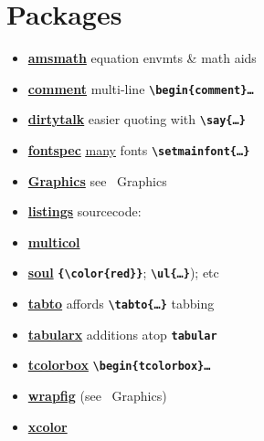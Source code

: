 \section{Packages}


\begin{itemize}[label=-,leftmargin=*]
    \item \textbf{\href{http://mirrors.ctan.org/macros/latex/required/amsmath/amsldoc.pdf}{amsmath}} \tabto*{15mm} equation envmts \& math aids
    \item \textbf{\href{http://mirrors.ctan.org/macros/latex/contrib/comment/comment.pdf}{comment}} \tabto*{15mm} multi-line {\tt\bf \textbackslash begin\{comment\}\dots}
    \item \textbf{\href{http://mirrors.ctan.org/macros/latex/contrib/dirtytalk/dirtytalk.pdf}{dirtytalk}} \tabto*{15mm} easier quoting with {\tt\bf \textbackslash say\{\dots\}}
    \item \textbf{\href{http://mirrors.ctan.org/macros/unicodetex/latex/fontspec/fontspec.pdf}{fontspec}} \tabto*{15mm} \href{https://tug.org/FontCatalogue/}{\ul{many}} fonts {\tt\bf\textbackslash setmainfont\{\dots\}}
    \item \textbf{\href{http://mirrors.ctan.org/macros/latex/required/graphics/graphics.pdf}{Graphics}} \tabto*{15mm} see \textsection\ Graphics
    \item \textbf{\href{http://mirrors.ctan.org/macros/latex/contrib/listings/listings.pdf}{listings}} \tabto*{15mm} sourcecode: 
    \item \textbf{\href{http://mirrors.ctan.org/macros/latex/required/tools/multicol.pdf}{multicol}} \tabto*{15mm} 
    \item \textbf{\href{http://mirrors.ctan.org/macros/generic/soul/soul.pdf}{soul}} \tabto*{15mm} {\tt\bf \{\textbackslash color\{red\}\}}; {\tt\bf \textbackslash ul\{\dots\}}); etc
    \item \textbf{\href{http://mirrors.ctan.org/macros/latex/contrib/tabto/tabto-doc.pdf}{tabto}} \tabto*{15mm} affords {\tt\bf \textbackslash tabto\{\dots\}} tabbing
    \item \textbf{\href{http://mirrors.ctan.org/macros/latex/required/tools/tabularx.pdf}{tabularx}} \tabto*{15mm} additions atop {\tt\bf tabular}
    \item \textbf{\href{https://www.overleaf.com/latex/examples/drawing-coloured-boxes-using-tcolorbox/pvknncpjyfbp}{tcolorbox}} \tabto*{15mm} {\tt\bf\textbackslash begin\{tcolorbox\}\dots} 
    \item \textbf{\href{http://mirrors.ctan.org/macros/latex/contrib/wrapfig/wrapfig-doc.pdf}{wrapfig}} \tabto*{15mm} (see \textsection\ Graphics)
    \item \textbf{\href{http://mirrors.ctan.org/macros/latex/contrib/xcolor/xcolor.pdf}{xcolor}} \tabto*{15mm} 
\end{itemize}


